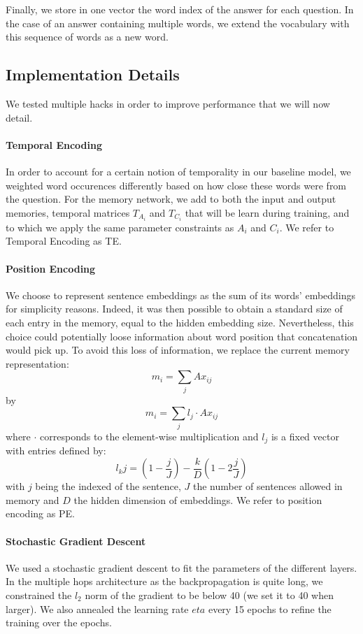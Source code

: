 \documentclass[twoside,11pt]{article}
\begin{document}
Finally, we store in one vector the word index of the answer for each question. In the case of an answer containing multiple words, we extend the vocabulary with this sequence of words as a new word. 

\subsection{Implementation Details}

\noindent We tested multiple hacks in order to improve performance that we will now detail.

\paragraph{Temporal Encoding}
In order to account for a certain notion of temporality in our baseline model, we weighted word occurences differently based on how close these words were from the question. For the memory network, we add to both the input and output memories, temporal matrices $T_{A_i}$ and $T_{C_i}$ that will be learn during training, and to which we apply the same parameter constraints as $A_i$ and $C_i$. We refer to Temporal Encoding as TE.
 
\paragraph{Position Encoding}
We choose to represent sentence embeddings as the sum of its words' embeddings for simplicity reasons. Indeed, it was then possible to obtain a standard size of each entry in the memory, equal to the hidden embedding size. Nevertheless, this choice could potentially loose information about word position that concatenation would pick up. To avoid this loss of information, we replace the current memory representation:$$m_i = \sum_j Ax_{ij}$$ by $$m_i = \sum_j l_j\cdot A x_{ij}$$ where $\cdot$ corresponds to the element-wise multiplication and $l_j$ is a fixed vector with entries defined by: $$l_kj = (1-\frac{j}{J})-\frac{k}{D}(1-2\frac{j}{J})$$ with $j$ being the indexed of the sentence, $J$ the number of sentences allowed in memory and $D$ the hidden dimension of embeddings. We refer to position encoding as PE.

\paragraph{Stochastic Gradient Descent}
We used a stochastic gradient descent to fit the parameters of the different layers. In the multiple hops architecture as the backpropagation is quite long, we constrained the $l_2$ norm of the gradient to be below 40 (we set it to 40 when larger). We also annealed the learning rate $eta$ every 15 epochs to refine the training over the epochs.
\end{document}
